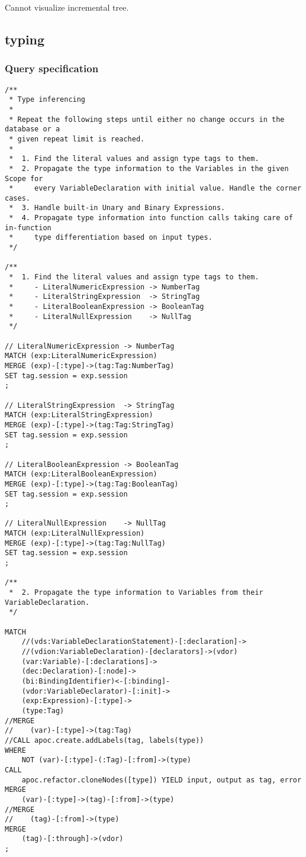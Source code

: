 Cannot visualize incremental tree.
\subsection{typing}

\subsubsection*{Query specification}

\begin{lstlisting}
/**
 * Type inferencing
 *
 * Repeat the following steps until either no change occurs in the database or a
 * given repeat limit is reached.
 *
 *  1. Find the literal values and assign type tags to them.
 *  2. Propagate the type information to the Variables in the given Scope for
 *     every VariableDeclaration with initial value. Handle the corner cases.
 *  3. Handle built-in Unary and Binary Expressions.
 *  4. Propagate type information into function calls taking care of in-function
 *     type differentiation based on input types.
 */

/**
 *  1. Find the literal values and assign type tags to them.
 *     - LiteralNumericExpression -> NumberTag
 *     - LiteralStringExpression  -> StringTag
 *     - LiteralBooleanExpression -> BooleanTag
 *     - LiteralNullExpression    -> NullTag
 */

// LiteralNumericExpression -> NumberTag
MATCH (exp:LiteralNumericExpression)
MERGE (exp)-[:type]->(tag:Tag:NumberTag)
SET tag.session = exp.session
;

// LiteralStringExpression  -> StringTag
MATCH (exp:LiteralStringExpression)
MERGE (exp)-[:type]->(tag:Tag:StringTag)
SET tag.session = exp.session
;

// LiteralBooleanExpression -> BooleanTag
MATCH (exp:LiteralBooleanExpression)
MERGE (exp)-[:type]->(tag:Tag:BooleanTag)
SET tag.session = exp.session
;

// LiteralNullExpression    -> NullTag
MATCH (exp:LiteralNullExpression)
MERGE (exp)-[:type]->(tag:Tag:NullTag)
SET tag.session = exp.session
;

/**
 *  2. Propagate the type information to Variables from their VariableDeclaration.
 */

MATCH
    //(vds:VariableDeclarationStatement)-[:declaration]->
    //(vdion:VariableDeclaration)-[declarators]->(vdor)
    (var:Variable)-[:declarations]->
    (dec:Declaration)-[:node]->
    (bi:BindingIdentifier)<-[:binding]-
    (vdor:VariableDeclarator)-[:init]->
    (exp:Expression)-[:type]->
    (type:Tag)
//MERGE
//    (var)-[:type]->(tag:Tag)
//CALL apoc.create.addLabels(tag, labels(type))
WHERE
    NOT (var)-[:type]-(:Tag)-[:from]->(type)
CALL
    apoc.refactor.cloneNodes([type]) YIELD input, output as tag, error
MERGE
    (var)-[:type]->(tag)-[:from]->(type)
//MERGE
//    (tag)-[:from]->(type)
MERGE
    (tag)-[:through]->(vdor)
;



\end{lstlisting}
